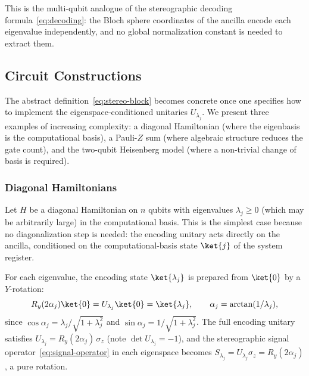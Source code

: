 This is the multi-qubit analogue of the stereographic decoding
formula~\eqref{eq:decoding}: the Bloch sphere coordinates of the
ancilla encode each eigenvalue independently, and no global
normalization constant is needed to extract them.

\subsection{Circuit Constructions}
\label{subsec:concrete-block}

The abstract definition~\eqref{eq:stereo-block} becomes concrete
once one specifies how to implement the eigenspace-conditioned
unitaries $U_{\lambda_j}$.  We present three examples of
increasing complexity: a diagonal Hamiltonian (where the
eigenbasis is the computational basis), a Pauli-$Z$ sum (where
algebraic structure reduces the gate count), and the two-qubit
Heisenberg model (where a non-trivial change of basis is
required).

\subsubsection{Diagonal Hamiltonians}
\label{subsubsec:diagonal}

Let $H$ be a diagonal Hamiltonian on $n$ qubits with
eigenvalues $\lambda_j \geq 0$ (which may be arbitrarily
large) in the computational basis.  This is the simplest case
because no diagonalization step is needed: the encoding
unitary acts directly on the ancilla, conditioned on the
computational-basis state $\ket{j}$ of the system register.

For each eigenvalue, the encoding state $\ket{\lambda_j}$ is
prepared from $\ket{0}$ by a $Y$-rotation:
\begin{equation}
	R_y(2\alpha_j)\ket{0} = U_{\lambda_j}\ket{0} = \ket{\lambda_j}, \qquad \alpha_j = \arctan(1/\lambda_j),
	\label{eq:diagonal-ry}
\end{equation}
since $\cos\alpha_j = \lambda_j/\sqrt{1+\lambda_j^2}$ and
$\sin\alpha_j = 1/\sqrt{1+\lambda_j^2}$.  The full encoding
unitary satisfies
$U_{\lambda_j} = R_y(2\alpha_j)\,\sigma_z$ (note
$\det U_{\lambda_j} = -1$), and the stereographic signal
operator~\eqref{eq:signal-operator} in each eigenspace becomes
$S_{\lambda_j} = U_{\lambda_j}\sigma_z = R_y(2\alpha_j)$,
a pure rotation.

